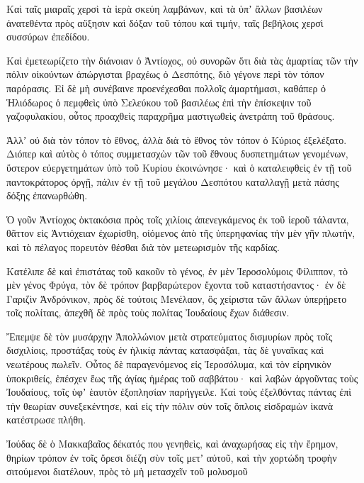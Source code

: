 {Καὶ ταῖς μιαραῖς χερσὶ τὰ ἱερὰ σκεύη λαμβάνων, καὶ τὰ ὑπʼ ἄλλων βασιλέων ἀνατεθέντα πρὸς αὔξησιν καὶ δόξαν τοῦ τόπου καὶ τιμήν, ταῖς βεβήλοις χερσὶ συσσύρων ἐπεδίδου.
\par }{\PP {}Καὶ ἐμετεωρίζετο τὴν διάνοιαν ὁ Ἀντίοχος, οὐ συνορῶν ὅτι διὰ τὰς ἁμαρτίας τῶν τὴν πόλιν οἰκούντων ἀπώργισται βραχέως ὁ Δεσπότης, διὸ γέγονε περὶ τὸν τόπον παρόρασις.
Εἰ δὲ μὴ συνέβαινε προενέχεσθαι πολλοῖς ἁμαρτήμασι, καθάπερ ὁ Ἡλιόδωρος ὁ πεμφθεὶς ὑπὸ Σελεύκου τοῦ βασιλέως ἐπὶ τὴν ἐπίσκεψιν τοῦ γαζοφυλακίου, οὗτος προαχθεὶς παραχρῆμα μαστιγωθεὶς ἀνετράπη τοῦ θράσους.
\par }{\PP {}Ἀλλʼ οὐ διὰ τὸν τόπον τὸ ἔθνος, ἀλλὰ διὰ τὸ ἔθνος τὸν τόπον ὁ Κύριος ἐξελέξατο.
Διόπερ καὶ αὐτὸς ὁ τόπος συμμετασχὼν τῶν τοῦ ἔθνους δυσπετημάτων γενομένων, ὕστερον εὐεργετημάτων ὑπὸ τοῦ Κυρίου ἐκοινώνησε· καὶ ὁ καταλειφθεὶς ἐν τῇ τοῦ παντοκράτορος ὀργῇ, πάλιν ἐν τῇ τοῦ μεγάλου Δεσπότου καταλλαγῇ μετὰ πάσης δόξης ἐπανωρθώθη.
\par }{\PP {}Ὁ γοῦν Ἀντίοχος ὀκτακόσια πρὸς τοῖς χιλίοις ἀπενεγκάμενος ἐκ τοῦ ἱεροῦ τάλαντα, θᾶττον εἰς Ἀντιόχειαν ἐχωρίσθη, οἰόμενος ἀπὸ τῆς ὑπερηφανίας τὴν μὲν γῆν πλωτὴν, καὶ τὸ πέλαγος πορευτὸν θέσθαι διὰ τὸν μετεωρισμὸν τῆς καρδίας.
\par }{\PP {}Κατέλιπε δὲ καὶ ἐπιστάτας τοῦ κακοῦν τὸ γένος, ἐν μὲν Ἱεροσολύμοις Φίλιππον, τὸ μὲν γένος Φρύγα, τὸν δὲ τρόπον βαρβαρώτερον ἔχοντα τοῦ καταστήσαντος·
ἐν δὲ Γαριζὶν Ἀνδρόνικον, πρὸς δὲ τούτοις Μενέλαον, ὃς χείριστα τῶν ἄλλων ὑπερῄρετο τοῖς πολίταις, ἀπεχθῆ δὲ πρὸς τοὺς πολίτας Ἰουδαίους ἔχων διάθεσιν.
\par }{\PP {}Ἔπεμψε δὲ τὸν μυσάρχην Ἀπολλώνιον μετὰ στρατεύματος δισμυρίων πρὸς τοῖς δισχιλίοις, προστάξας τοὺς ἐν ἡλικίᾳ πάντας κατασφάξαι, τὰς δὲ γυναῖκας καὶ νεωτέρους πωλεῖν.
Οὗτος δὲ παραγενόμενος εἰς Ἱεροσόλυμα, καὶ τὸν εἰρηνικὸν ὑποκριθείς, ἐπέσχεν ἕως τῆς ἁγίας ἡμέρας τοῦ σαββάτου· καὶ λαβὼν ἀργοῦντας τοὺς Ἰουδαίους, τοῖς ὑφʼ ἑαυτὸν ἐξοπλησίαν παρήγγειλε.
Καὶ τοὺς ἐξελθόντας πάντας ἐπὶ τὴν θεωρίαν συνεξεκέντησε, καὶ εἰς τὴν πόλιν σὺν τοῖς ὅπλοις εἰσδραμὼν ἱκανὰ κατέστρωσε πλήθη.
\par }{\PP {}Ἰούδας δὲ ὁ Μακκαβαῖος δέκατός που γενηθεὶς, καὶ ἀναχωρήσας εἰς τὴν ἔρημον, θηρίων τρόπον ἐν τοῖς ὄρεσι διέζη σὺν τοῖς μετʼ αὐτοῦ, καὶ τὴν χορτώδη τροφὴν σιτούμενοι διατέλουν, πρὸς τὸ μὴ μετασχεῖν τοῦ μολυσμοῦ

}

